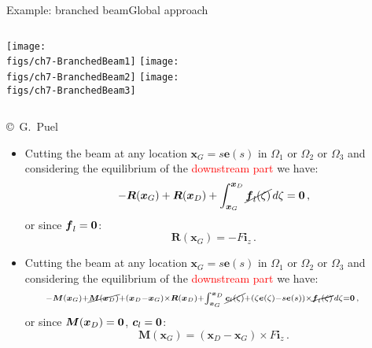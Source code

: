 \documentclass{beamer}
\newcommand{\id}{d}
\newcommand{\cj}{c}
\newcommand{\cv}{{\boldsymbol\cj}}
\newcommand{\xj}{x}
\newcommand{\zj}{z}
\newcommand{\xv}{{\boldsymbol\xj}}
\newcommand{\ej}{e}
\renewcommand{\ij}{i}
\newcommand{\ev}{{\boldsymbol\ej}}
\newcommand{\iv}{{\boldsymbol\ij}}
\newcommand{\medium}{\Omega}
\newcommand{\fj}{f}
\newcommand{\fv}{{\boldsymbol\fj}}
\newcommand{\Fresj}{R}
\newcommand{\Mresj}{M}
\newcommand{\Fres}{{\boldsymbol\Fresj}}
\newcommand{\Mres}{{\boldsymbol\Mresj}}
\newcommand{\bzero}{{\bf 0}}
\begin{document}
\begin{frame}{Example: branched beam}{Global approach}

\begin{columns}[t]
\centering\texttt{[image: \\figs/ch7-BranchedBeam1]}
\centering\texttt{[image: \\figs/ch7-BranchedBeam2]}
\centering\texttt{[image: \\figs/ch7-BranchedBeam3]}
\end{columns}
\vskip-7pt{\hspace{9truecm}\mbox{\tiny{\copyright\ G. Puel}}}

\begin{overprint}

\begin{itemize}
\item Cutting the beam at any location $\xv_G=s\ev(s)$ in $\medium_1$ or $\medium_2$ or $\medium_3$ and considering the equilibrium of the \textcolor{red}{downstream part} we have:
\begin{displaymath}
-\Fres(\xv_G)+\Fres(\xv_D)+\int_{\xv_G}^{\xv_D}\cancel{\fv_l(\zeta)}\,\id\zeta=\bzero\,,
\end{displaymath}
or since $\fv_l=\bzero$:
\begin{displaymath}
\Fres(\xv_G)=-F\iv_\zj\,.
\end{displaymath}
\end{itemize}

\begin{itemize}
\item Cutting the beam at any location $\xv_G=s\ev(s)$ in $\medium_1$ or $\medium_2$ or $\medium_3$ and considering the equilibrium of the \textcolor{red}{downstream part} we have:
\begin{displaymath}
\!\!\!\!\!\!\!\!\!\!\!\!\scriptstyle -\Mres(\xv_G)+\cancel{\Mres(\xv_D)}+(\xv_D-\xv_G)\times\Fres(\xv_D) +\int_{\xv_G}^{\xv_D}\cancel{\cv_l(\zeta)}+(\zeta\ev(\zeta)-s\ev(s))\times\cancel{\fv_l(\zeta)}\,\id\zeta=\bzero\,,
\end{displaymath}
or since $\Mres(\xv_D)=\bzero$, $\cv_l=\bzero$:
\begin{displaymath}
\Mres(\xv_G)=(\xv_D-\xv_G)\times F\iv_\zj\,.
\end{displaymath}
\end{itemize}

\end{overprint}

\end{frame}
\end{document}
